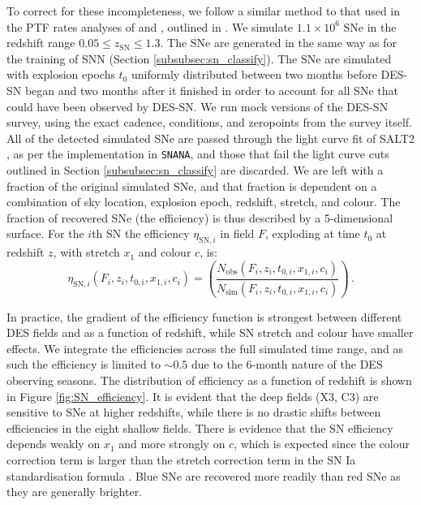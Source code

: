 \documentclass[fleqn,usenatbib]{mnras}
\begin{document}
To correct for these incompleteness, we follow a similar method to that used in the PTF rates analyses of \citet{Frohmaier2019} and \citet{Frohmaier2020}, outlined in \citet{Frohmaier2017}. We simulate $1.1\times 10^6$ SNe in the redshift range $0.05 \leq z_{\mathrm{SN}} \leq 1.3$. The SNe are generated in the same way as for the training of SNN (Section \ref{subsubsec:sn_classify}). The SNe are simulated with explosion epochs $t_0$ uniformly distributed between two months before DES-SN began and two months after it finished in order to account for all SNe that could have been observed by DES-SN. We run mock versions of the DES-SN survey, using the exact cadence, conditions, and zeropoints from the survey itself. All of the detected simulated SNe are passed through the light curve fit of SALT2 \citep{Betoule2014}, as per the implementation in \texttt{SNANA}, and those that fail the light curve cuts outlined in Section \ref{subsubsec:sn_classify} are discarded. We are left with a fraction of the original simulated SNe, and that fraction is dependent on a combination of sky location, explosion epoch, redshift, stretch, and colour. The fraction of recovered SNe (the efficiency) is thus described by a 5-dimensional surface. For the $i$th SN the efficiency $\eta_{\mathrm{SN}, i}$ in field $F$, exploding at time $t_0$ at redshift $z$, with stretch $x_1$ and colour $c$, is:
\begin{equation}
    \eta_{\mathrm{SN},i} (F_i,z_i,t_{0,i},x_{1,i},c_i) = \left( \frac{N_{\mathrm{obs}}\left(F_i,z_i,t_{0,i},x_{1,i},c_i\right)}{N_{\mathrm{sim}}\left(F_i,z_i,t_{0,i},x_{1,i},c_i\right)}\right)\,.
\end{equation}

In practice, the gradient of the efficiency function is strongest between different DES fields and as a function of redshift, while SN stretch and colour have smaller effects. We integrate the efficiencies across the full simulated time range, and as such the efficiency is limited to $\sim 0.5$ due to the 6-month nature of the DES observing seasons.
The distribution of efficiency as a function of redshift is shown in Figure \ref{fig:SN_efficiency}. It is evident that the deep fields (X3, C3) are sensitive to SNe at higher redshifts, while there is no drastic shifts between efficiencies in the eight shallow fields. There is evidence that the SN efficiency depends weakly on $x_1$ and more strongly on $c$, which is expected since the colour correction term is larger than the stretch correction term in the SN Ia standardisation formula \citep{Tripp1998}. Blue SNe are recovered more readily than red SNe as they are generally brighter. 
\end{document}
